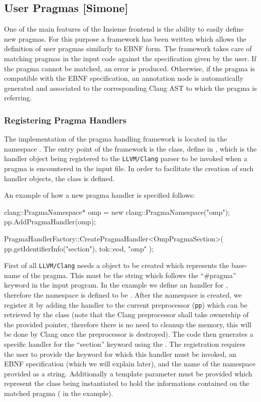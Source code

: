 \subsection{User Pragmas [Simone]}
\label{sec:Insieme.Frontend.Pragmas}

One of the main features of the Insieme frontend is the ability to easily define
new pragmas. For this purpose a framework has been written which allows the
definition of user pragmas similarly to EBNF form. The framework takes care of
matching pragmas in the input code against the specification given by the user.
If the pragma cannot be matched, an error is produced. Otherwise, if the pragma
is compatible with the EBNF specification, an annotation node is automatically 
generated and associated to the corresponding Clang AST to which the pragma is 
referring. 


\subsubsection{Registering Pragma Handlers}

The implementation of the pragma handling framework is located in the namespace
. The entry point of the framework is the
 class, define in ,
which is the handler object being registered to the {\tt LLVM/Clang} parser to
be invoked when a pragma is encountered in the input file. In order to
facilitate the creation of such handler objects, the
 class is defined. 

An example of how a new pragma handler is specified follows:
\begin{srcCode}
clang::PragmaNamespace* omp = new clang::PragmaNamespace("omp");
pp.AddPragmaHandler(omp);

PragmaHandlerFactory::CreatePragmaHandler<OmpPragmaSection>(
	pp.getIdentifierInfo("section"), tok::eod, "omp"
);
\end{srcCode}

First of all {\tt LLVM/Clang} needs a  object to be
created which represents the base-name of the pragma. This must be the string
which follows the ``\#pragma'' keyword in the input program. In the example we
define an handler for , therefore the namespace
is defined to be . After the namespace is created, we register
it by adding the handler to the current preprocessor ({\tt pp}) which can be
retrieved by the  class (note that the Clang
preprocessor shall take ownership of the provided pointer, therefore there is no
need to cleanup the memory, this will be done by Clang once the preprocessor is
destroyed). The code then generates a specific handler for the ``section''
keyword using the . The registration requires the
user to provide the keyword for which this handler must be invoked, an EBNF
specification (which we will explain later), and the name of the namespace
provided as a string. Additionally a template parameter must be provided which
represent the class being instantiated to hold the informations contained on the
matched pragma ( in the example). 

